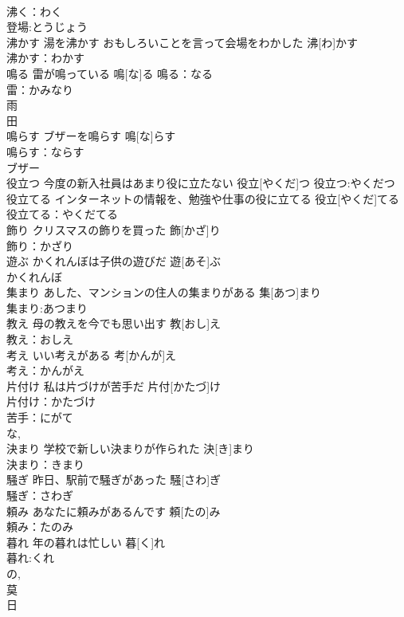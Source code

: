 \documentclass[8pt]{extreport}
\begin{document}
\begin{CJK}{UTF8}{min}
\\	沸く：わく
\\	登場:とうじょう
\\	沸かす	湯を沸かす おもしろいことを言って会場をわかした	沸[わ]かす	
\\	沸かす：わかす
\\	鳴る	雷が鳴っている	鳴[な]る			鳴る：なる
\\	雷：かみなり
\\	雨 
\\	田 
\\	鳴らす	ブザーを鳴らす	鳴[な]らす	
\\	鳴らす：ならす
\\	ブザー
\\	役立つ	今度の新入社員はあまり役に立たない	役立[やくだ]つ			役立つ:やくだつ
\\	役立てる	インターネットの情報を、勉強や仕事の役に立てる	役立[やくだ]てる			役立てる：やくだてる
\\	飾り	クリスマスの飾りを買った	飾[かざ]り	
\\	飾り：かざり
\\	遊ぶ	かくれんぼは子供の遊びだ	遊[あそ]ぶ	
\\	かくれんぼ
\\	集まり	あした、マンションの住人の集まりがある	集[あつ]まり	
\\	集まり:あつまり
\\	教え	母の教えを今でも思い出す	教[おし]え	
\\	教え：おしえ
\\	考え	いい考えがある	考[かんが]え	
\\	考え：かんがえ
\\	片付け	私は片づけが苦手だ	片付[かたづ]け	
\\	片付け：かたづけ
\\	苦手：にがて
\\	な, 
\\	決まり	学校で新しい決まりが作られた	決[き]まり	
\\	決まり：きまり
\\	騒ぎ	昨日、駅前で騒ぎがあった	騒[さわ]ぎ	
\\	騒ぎ：さわぎ
\\	頼み	あなたに頼みがあるんです	頼[たの]み	
\\	頼み：たのみ
\\	暮れ	年の暮れは忙しい	暮[く]れ	
\\	暮れ:くれ
\\	の, 
\\	莫 
\\	日 

\end{CJK}
\end{document}
